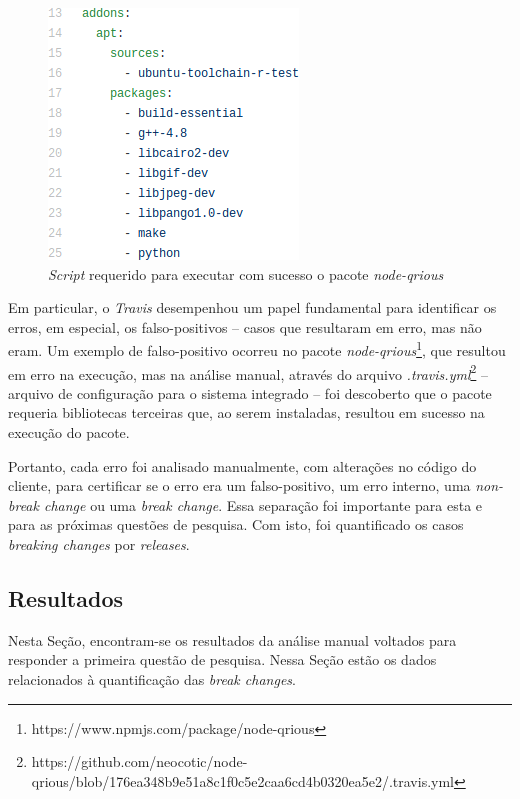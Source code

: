\begin{itemize}
    \begin{figure}
        \centering
        \includegraphics[scale=0.6]{figuras/false_positive.png}
        \caption{\textit{Script} requerido para executar com sucesso o pacote \textit{node-qrious}}
        \label{fig:false-positive}
    \end{figure}{}

    Em particular, o \textit{Travis} desempenhou um papel fundamental para identificar os erros, em especial, os falso-positivos -- casos que resultaram em erro, mas não eram. Um exemplo de falso-positivo ocorreu no pacote \textit{node-qrious}\footnote{https://www.npmjs.com/package/node-qrious}, que resultou em erro na execução, mas na análise manual, através do arquivo \textit{.travis.yml}\footnote{https://github.com/neocotic/node-qrious/blob/176ea348b9e51a8c1f0c5e2caa6cd4b0320ea5e2/.travis.yml} -- arquivo de configuração para o sistema integrado -- foi descoberto que o pacote requeria bibliotecas terceiras que, ao serem instaladas, resultou em sucesso na execução do pacote.
\end{itemize}{}

Portanto, cada erro foi analisado manualmente, com alterações no código do cliente, para certificar se o erro era um falso-positivo, um erro interno, uma \textit{non-break change} ou uma \textit{break change}. Essa separação foi importante para esta e para as próximas questões de pesquisa. Com isto, foi quantificado os casos \textit{breaking changes} por \textit{releases}.

\subsection{Resultados}
\label{fin:rq1}
Nesta Seção, encontram-se os resultados da análise manual voltados para responder a primeira questão de pesquisa. Nessa Seção estão os dados relacionados à quantificação das \textit{break changes}.


